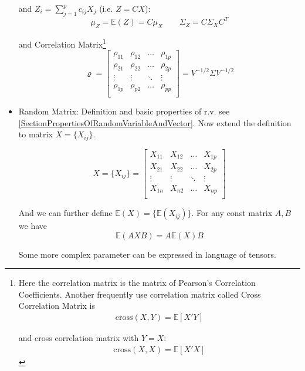 \begin{itemize}[topsep=6pt,itemsep=4pt]
    and $ Z_i=\sum_{j=1}^p c_{ij}X_j $ (i.e. $ Z=CX $):
    \begin{equation}
        \mu_Z=\mathbb{E}(Z)= C\mu_X\qquad \Sigma _Z=C\Sigma _XC^T
    \end{equation}
    
    
    
    

    and Correlation Matrix\footnote{Here the correlation matrix is the matrix of Pearson's Correlation Coefficients. Another frequently use correlation matrix called Cross Correlation Matrix is 
    \begin{align}
            \mathrm{cross}(X,Y)= \mathbb{E}\left[ X'Y \right]
    \end{align}

    and cross correlation matrix with $ Y=X $:
    \begin{align}
        \mathrm{cross}(X,X)=  \mathbb{E}\left[ X'X\right]
    \end{align}
    }
    \begin{equation}
        \varrho  =\begin{bmatrix}
        \rho _{11}&\rho _{12}&\ldots&\rho _{1p}\\
        \rho _{21}&\rho _{22}&\ldots&\rho _{2p}\\
        \vdots&\vdots&\ddots&\vdots\\
        \rho _{1p}&\rho _{p2}&\ldots&\rho _{pp}\\
        \end{bmatrix} 
        =V^{-1/2}\Sigma V^{-1/2}
    \end{equation}
    
    \item Random Matrix: Definition and basic properties of r.v. see \autoref{SectionPropertiesOfRandomVariableAndVector}. Now extend the definition to matrix $ X=\{X_{ij}\} $. 
    
    \begin{equation}
        X=\{X_{ij}\}=\begin{bmatrix}
        X_{11}&X_{12}&\ldots&X_{1p}\\
        X_{21}&X_{22}&\ldots&X_{2p}\\
        \vdots&\vdots&\ddots&\vdots\\
        X_{1n}&X_{n2}&\ldots&X_{np}\\
        \end{bmatrix} 
    \end{equation}

    And we can further define $ \mathbb{E}(X)=\{\mathbb{E}(X_{ij})\} $.
    For any const matrix $ A,B $ we have
    \begin{equation}
        \mathbb{E}(AXB)=A\mathbb{E}(X)B 
    \end{equation}

    Some more complex parameter can be expressed in language of tensors.
    
    \end{itemize}
    
